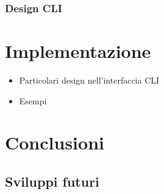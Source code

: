 \documentclass[12pt,a4paper,openright,twoside]{book}
\begin{document}
\subsection{Design CLI}

\chapter{Implementazione}

\begin{itemize}
	\item Particolari design nell'interfaccia CLI
	\item Esempi
\end{itemize}

\chapter{Conclusioni}

\section{Sviluppi futuri}


\backmatter

\nocite{*} %



\end{document}
